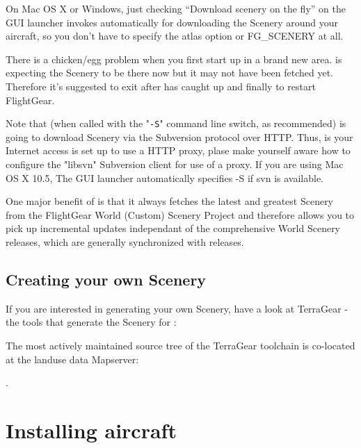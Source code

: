 On Mac OS X or Windows, just checking ``Download scenery on the fly'' on
the GUI launcher invokes \TerraSync{} automatically for downloading the Scenery
around your aircraft, so you don't have to specify the atlas option or 
FG\_SCENERY at all. 

There is a chicken/egg problem when you first start up in a brand new
area.  \FlightGear{} is expecting the Scenery to be there now but it may
not have been fetched yet. Therefore it's suggested to exit \FlightGear{}
after \TerraSync{} has caught up and finally to restart FlightGear.

Note that \TerraSync{} (when called with the "\texttt{-S}" command line
switch, as recommended) is going to download Scenery via the Subversion
protocol over HTTP. Thus, is your Internet access is set up to use a
HTTP proxy, plase make yourself aware how to configure the "libsvn"
Subversion client for use of a proxy. If you are using Mac OS X 10.5,
The GUI launcher automatically specifies -S if svn is available.
\medskip

One major benefit of \TerraSync{} is that it always fetches the latest and
greatest Scenery from the FlightGear World (Custom) Scenery Project and
therefore allows you to pick up incremental updates independant of the
comprehensive World Scenery releases, which are generally synchronized
with \FlightGear{} releases.

\subsection{Creating your own Scenery}

If you are interested in generating your own Scenery, have a look at TerraGear -
the tools that generate the Scenery for \FlightGear{}:

\medskip
{}
\medskip

The most actively maintained source tree of the TerraGear toolchain is
co-located at the \FlightGear{} landuse data Mapserver:

\medskip
{}.
\medskip

\section{Installing aircraft}\label{install_aircraft}


